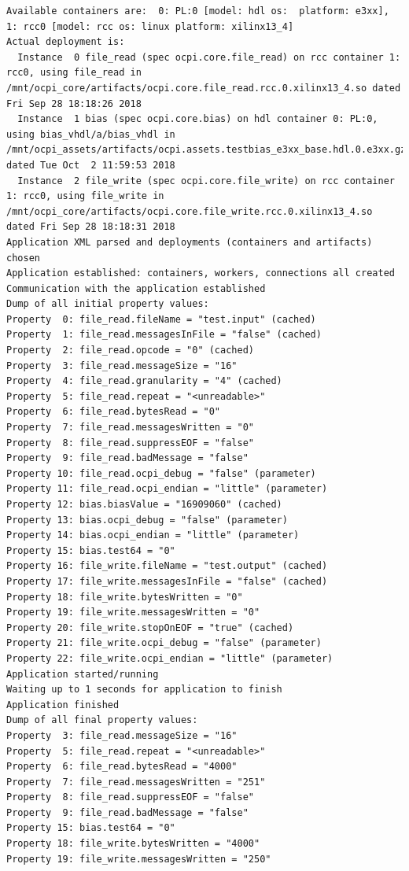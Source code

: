\begin{lstlisting}[showspaces=false]
Available containers are:  0: PL:0 [model: hdl os:  platform: e3xx], 1: rcc0 [model: rcc os: linux platform: xilinx13_4]
Actual deployment is:
  Instance  0 file_read (spec ocpi.core.file_read) on rcc container 1: rcc0, using file_read in /mnt/ocpi_core/artifacts/ocpi.core.file_read.rcc.0.xilinx13_4.so dated Fri Sep 28 18:18:26 2018
  Instance  1 bias (spec ocpi.core.bias) on hdl container 0: PL:0, using bias_vhdl/a/bias_vhdl in /mnt/ocpi_assets/artifacts/ocpi.assets.testbias_e3xx_base.hdl.0.e3xx.gz dated Tue Oct  2 11:59:53 2018
  Instance  2 file_write (spec ocpi.core.file_write) on rcc container 1: rcc0, using file_write in /mnt/ocpi_core/artifacts/ocpi.core.file_write.rcc.0.xilinx13_4.so dated Fri Sep 28 18:18:31 2018
Application XML parsed and deployments (containers and artifacts) chosen
Application established: containers, workers, connections all created
Communication with the application established
Dump of all initial property values:
Property  0: file_read.fileName = "test.input" (cached)
Property  1: file_read.messagesInFile = "false" (cached)
Property  2: file_read.opcode = "0" (cached)
Property  3: file_read.messageSize = "16"
Property  4: file_read.granularity = "4" (cached)
Property  5: file_read.repeat = "<unreadable>"
Property  6: file_read.bytesRead = "0"
Property  7: file_read.messagesWritten = "0"
Property  8: file_read.suppressEOF = "false"
Property  9: file_read.badMessage = "false"
Property 10: file_read.ocpi_debug = "false" (parameter)
Property 11: file_read.ocpi_endian = "little" (parameter)
Property 12: bias.biasValue = "16909060" (cached)
Property 13: bias.ocpi_debug = "false" (parameter)
Property 14: bias.ocpi_endian = "little" (parameter)
Property 15: bias.test64 = "0"
Property 16: file_write.fileName = "test.output" (cached)
Property 17: file_write.messagesInFile = "false" (cached)
Property 18: file_write.bytesWritten = "0"
Property 19: file_write.messagesWritten = "0"
Property 20: file_write.stopOnEOF = "true" (cached)
Property 21: file_write.ocpi_debug = "false" (parameter)
Property 22: file_write.ocpi_endian = "little" (parameter)
Application started/running
Waiting up to 1 seconds for application to finish
Application finished
Dump of all final property values:
Property  3: file_read.messageSize = "16"
Property  5: file_read.repeat = "<unreadable>"
Property  6: file_read.bytesRead = "4000"
Property  7: file_read.messagesWritten = "251"
Property  8: file_read.suppressEOF = "false"
Property  9: file_read.badMessage = "false"
Property 15: bias.test64 = "0"
Property 18: file_write.bytesWritten = "4000"
Property 19: file_write.messagesWritten = "250"
\end{lstlisting}

